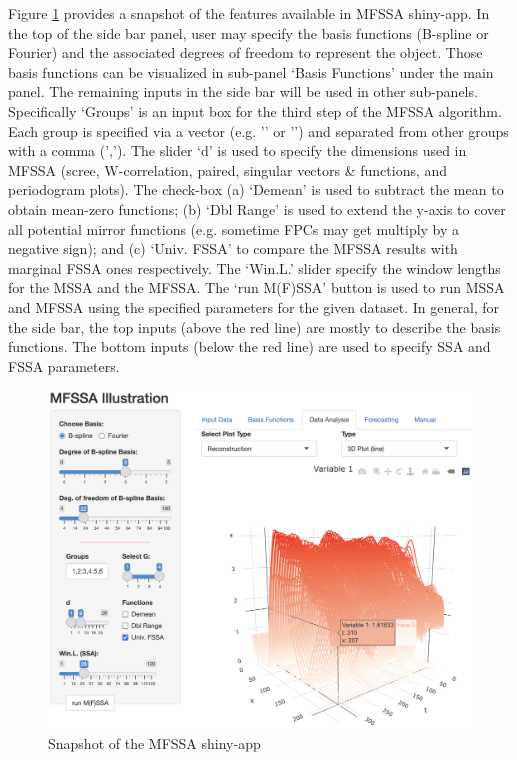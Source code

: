 Figure \ref{fig:shiny} provides a snapshot of the features available in MFSSA shiny-app. In the top of the side bar panel, user may specify the basis functions (B-spline or Fourier) and the associated degrees of freedom to represent the  object. Those basis functions can be visualized in sub-panel \textsf{`Basis Functions'} under the main panel. The remaining inputs in the side bar will be used in other sub-panels. Specifically `Groups' is an input box for the third step of the MFSSA algorithm. Each group is specified via a vector (e.g. '' or '') and separated from other groups with a comma (','). The slider `d' is used to specify the dimensions used in MFSSA (scree, W-correlation, paired, singular vectors \& functions, and periodogram plots). The check-box (a) `Demean' is used to subtract the mean to obtain mean-zero functions; (b) `Dbl Range' is used to extend the y-axis to cover all potential mirror functions (e.g. sometime FPCs may get multiply by a negative sign); and (c) `Univ. FSSA' to compare the MFSSA results with marginal FSSA ones respectively. The `Win.L.' slider specify the window lengths for the MSSA and the MFSSA. The `run M(F)SSA' button is used to run MSSA and MFSSA using the specified parameters for the given dataset. In general, for the side bar, the top inputs (above the red line) are mostly to describe the basis functions. The bottom inputs (below the red line) are used to specify SSA and FSSA parameters.

\begin{figure}[t]
	\centering
	\includegraphics[width=\textwidth]{figures/shiny.png}
	\caption{Snapshot of the MFSSA shiny-app}
	\label{fig:shiny}
\end{figure}

